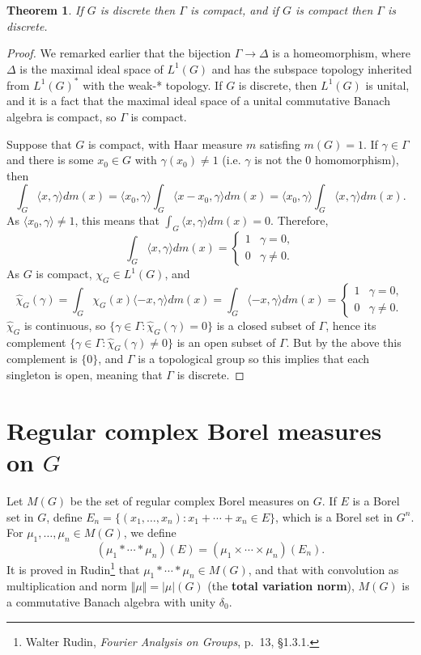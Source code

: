 \documentclass{article}
\newcommand{\inner}[2]{\langle #1, #2 \rangle}
\newcommand{\norm}[1]{\Vert #1 \Vert}
\newtheorem{theorem}{Theorem}
\begin{document}
\begin{theorem}
If $G$ is discrete then $\Gamma$ is compact, and if $G$ is compact then $\Gamma$ is discrete.
\end{theorem}
\begin{proof}
We remarked earlier that the bijection $\Gamma \to \Delta$ is a homeomorphism, where $\Delta$
is the maximal ideal space of $L^1(G)$ and has the subspace topology inherited from $L^1(G)^*$ with the weak-*
topology. If $G$ is discrete, then $L^1(G)$ is unital, and it is a fact that the maximal ideal space of a unital commutative
Banach algebra is compact, so $\Gamma$ is compact.

Suppose that $G$ is compact, with Haar measure $m$ satisfing $m(G)=1$. If $\gamma \in \Gamma$ and there
is some $x_0 \in G$ with $\gamma(x_0) \neq 1$ (i.e. $\gamma$ is not the $0$ homomorphism), then
\[
\int_G \inner{x}{\gamma} dm(x) = \inner{x_0}{\gamma} \int_G \inner{x-x_0}{\gamma} dm(x) = 
\inner{x_0}{\gamma} \int_G \inner{x}{\gamma} dm(x).
\] 
As $\inner{x_0}{\gamma} \neq 1$, this means that $\int_G \inner{x}{\gamma} dm(x) =0$. Therefore,
\[
\int_G \inner{x}{\gamma} dm(x) =\begin{cases}
1&\gamma =0,\\
0&\gamma \neq 0.
\end{cases}
\]
As $G$ is compact, $\chi_G \in L^1(G)$, and 
\[
\hat{\chi}_G(\gamma)=
\int_G  \chi_G(x) \inner{-x}{\gamma} dm(x)
=\int_G \inner{-x}{\gamma} dm(x)
=\begin{cases}
1&\gamma =0,\\
0&\gamma \neq 0.
\end{cases}
\]
$\hat{\chi}_G$ is continuous, so $\{\gamma \in \Gamma: \hat{\chi}_G(\gamma) =0\}$
is a closed subset of $\Gamma$, hence its complement $\{\gamma \in \Gamma: \hat{\chi}_G(\gamma) \neq  0\}$ is an open subset
of $\Gamma$. But by the above this complement is $\{0\}$, and $\Gamma$ is a topological group  so  this implies that
each singleton is open, meaning
that $\Gamma$ is discrete.
\end{proof}



\section{Regular complex Borel measures on $G$}
Let $M(G)$ be the set of regular complex Borel measures on $G$. If $E$ is a Borel set in $G$, define $E_n = \{(x_1,\ldots,x_n): x_1+\cdots+x_n \in E\}$,
which is a Borel set in $G^n$. For $\mu_1,\ldots,\mu_n \in M(G)$, we define
\[
(\mu_1 * \cdots * \mu_n) (E)  = (\mu_1 \times \cdots \times \mu_n)(E_n).
\]
It is proved in Rudin\footnote{Walter Rudin, {\em Fourier Analysis on Groups}, p.~13, \S 1.3.1.} that $\mu_1 * \cdots * \mu_n \in
M(G)$, and that with convolution as multiplication
and norm $\norm{\mu}=|\mu|(G)$ (the
\textbf{total variation norm}),
 $M(G)$ is a commutative Banach algebra with unity $\delta_0$. 
\end{document}
